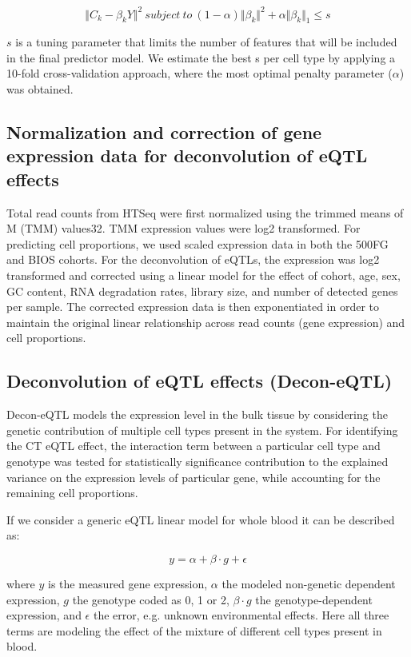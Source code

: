 \begin{equation}
\Vert C_{k}-\beta_{k} Y\Vert^2\ subject\ to\ (1 - \alpha) \Vert \beta_{k} \Vert^2 + \alpha \Vert \beta_{k} \Vert_{1} \leq  s
\end{equation}

$s$ is a tuning parameter that limits the number of features that will be included in the final predictor model. We estimate the best s per cell type by applying a 10-fold cross-validation approach, where the most optimal penalty parameter ($\alpha$) was obtained.

\subsection{Normalization and correction of gene expression data for deconvolution of eQTL effects}
Total read counts from HTSeq were first normalized using the trimmed means of M (TMM) values32. TMM expression values were log2 transformed. For predicting cell proportions, we used scaled expression data in both the 500FG and BIOS cohorts.
For the deconvolution of eQTLs, the expression was log2 transformed and corrected using a linear model for the effect of cohort, age, sex, GC content, RNA degradation rates, library size, and number of detected genes per sample. The corrected expression data is then exponentiated in order to maintain the original linear relationship across read counts (gene expression) and cell proportions.

\subsection{Deconvolution of eQTL effects (Decon-eQTL)}
Decon-eQTL models  the expression level in the bulk tissue by considering the genetic contribution of multiple  cell types present in the system. For identifying the CT eQTL effect, the interaction term between a particular cell type and genotype was tested for statistically significance contribution to the explained variance on the expression levels of particular gene, while accounting for the remaining cell proportions. 

If we consider a generic eQTL linear model for whole blood it can be described as:

\begin{equation}
y = \alpha + \beta\cdot g+\epsilon
\end{equation}

where $y$ is the measured gene expression, $\alpha$ the modeled non-genetic dependent expression, $g$ the genotype coded as 0, 1 or 2, $\beta\cdot g$ the genotype-dependent expression, and $\epsilon$ the error, e.g. unknown environmental effects. Here all three terms are modeling the effect of the mixture of different cell types present in blood. 

